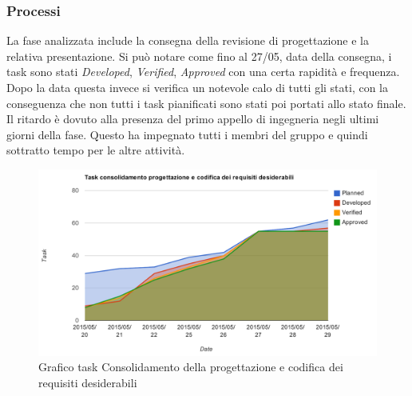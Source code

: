 		\subsubsection{Processi}
		La fase analizzata include la consegna della revisione di progettazione e la relativa presentazione. Si può notare come fino al 27/05, data della consegna, i task sono stati \textit{Developed}, \textit{Verified}, \textit{Approved} con una certa rapidità e frequenza. Dopo la data questa invece si verifica un notevole calo di tutti gli stati, con la conseguenza che non tutti i task pianificati sono stati poi portati allo stato finale. Il ritardo è dovuto alla presenza del primo appello di ingegneria negli ultimi giorni della fase. Questo ha impegnato tutti i membri del gruppo e quindi sottratto tempo per le altre attività.
			\begin{figure}[htbp]
				\centering
				\centerline{\includegraphics[scale=0.7]{images/Grafico_fase_7.pdf}}
				\caption{Grafico task Consolidamento della progettazione e codifica dei requisiti desiderabili}
				\label{fig:taskfase7}
			\end{figure}
			
